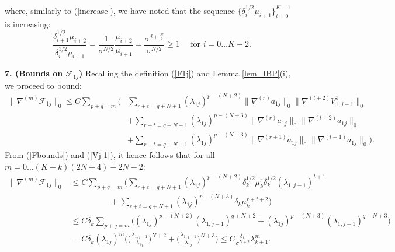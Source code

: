 \documentclass[reqno,twoside,11pt]{amsart}
\numberwithin{equation}{section}
\theoremstyle{plain}
\theoremstyle{definition}
\begin{document}
where, similarly to (\ref{increase}), we have noted that the sequence
$\{\delta_i^{1/2}\mu_{i+1}\}_{i=0}^{K-1}$ is increasing:
\begin{equation}\label{increase2}
\frac{\delta_{i+1}^{1/2}\mu_{i+2}}{\delta_i^{1/2}\mu_{i+1}} =
\frac{1}{\sigma^{N/2}} \frac{\mu_{i+2}}{\mu_{i+1}} =
\frac{\sigma^{d+\frac{N}{2}}}{\sigma^{N/2}} \geq 1 \quad \mbox{ for } i=0\ldots K-2.
\end{equation}

\medskip

{\bf 7. (Bounds on $\mathcal{F}_{1j}$)} Recalling the definition
(\ref{F1j}) and Lemma \ref{lem_IBP}(i), we proceed to bound:
\begin{equation*}
\begin{split}
\|\nabla^{(m)}\mathcal{F}_{1j}\|_0 \leq C\sum_{p+q=m}\Big(& \sum_{r+t=q+N+1}
(\lambda_{1j})^{p-(N+2)} \|\nabla^{(r)}a_{1j}\|_0\|\nabla^{(t+2)}V_{1,{j-1}}^1\|_0  \\ &
+ \sum_{r+t=q+N+1}
(\lambda_{1j})^{p-(N+3)}  \|\nabla^{(r)}a_{1j}\|_0\|\nabla^{(t+2)} a_{1j}\|_0 \\ & 
+ \sum_{r+t=q+N+1} (\lambda_{1j})^{p-(N+3)}  
\|\nabla^{(r+1)} a_{1j}\|_0\| \nabla^{(t+1)} a_{1j}\|_0 \Big).
\end{split}
\end{equation*}
From (\ref{Fbounds}) and (\ref{Vj-1}), it hence follows that for all $m=0\ldots (K-k)(2N+4)-2N-2$:
\begin{equation}\label{F1j_bound}
\begin{split}
\|\nabla^{(m)}\mathcal{F}_{1j}\|_0 & \leq  C\sum_{p+q=m}\Big(\sum_{r+t=q+N+1}
(\lambda_{1j})^{p-(N+2)} \delta_k^{1/2}\mu_k^r\delta_k^{1/2}
(\lambda_{1,j-1})^{t+1}\\ & \hspace{2cm} + \sum_{r+t=q+N+1}
(\lambda_{1j})^{p-(N+3)} \delta_k\mu_k^{r+t+2} \Big) \\ & \leq
C\delta_k \sum_{p+q=m}\Big( (\lambda_{1j})^{p-(N+2)}(\lambda_{1,j-1})^{q+N+2}
+ (\lambda_{1j})^{p-(N+3)}(\lambda_{1,j-1})^{q+N+3}\Big) \\ &
= C\delta_k (\lambda_{1j})^m\Big(\big(\frac{\lambda_{1,j-1}}{\lambda_{1j}}\big)^{N+2}
+ \big(\frac{\lambda_{1,j-1}}{\lambda_{1j}}\big)^{N+3}\Big)\leq
C\frac{\delta_k}{\sigma^{N+2}}\lambda_{k+1}^{m}.
\end{split}
\end{equation}

\medskip
\end{document}
